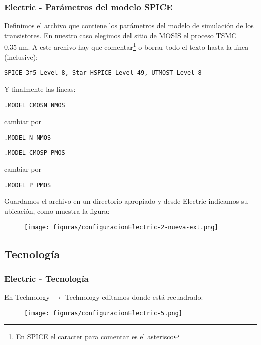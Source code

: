 \documentclass{beamer}
\begin{document}
\begin{frame}[fragile]
\frametitle{Electric - Parámetros del modelo SPICE}

Definimos el archivo que contiene los parámetros del modelo de simulación de los transistores.
En nuestro caso elegimos del sitio de \href{https://www.mosis.com/pages/design/flows/design-flow-scmos-kits}{MOSIS} el proceso \href{https://www.mosis.com/rep/vendors/tsmc-035/v01c_mm_non_epi-params.txt}{TSMC $0.35~\textrm{um}$}.
A este archivo hay que comentar\footnote{En SPICE el caracter para comentar es el asterisco}  o borrar todo el texto hasta la línea (inclusive):

\begin{scriptsize}
\verb.SPICE 3f5 Level 8, Star-HSPICE Level 49, UTMOST Level 8.
\end{scriptsize}

Y finalmente las líneas:

\begin{scriptsize}
\verb#.MODEL CMOSN NMOS#
\end{scriptsize} cambiar por \begin{scriptsize}\verb#.MODEL N NMOS# 

\verb#.MODEL CMOSP PMOS#\end{scriptsize} cambiar por \begin{scriptsize}\verb#.MODEL P PMOS# \end{scriptsize}

Guardamos el archivo en un directorio apropiado y desde Electric indicamos su ubicación,
como muestra la figura:
\begin{figure}
\texttt{[image: figuras/configuracionElectric-2-nueva-ext.png]}
\end{figure}

\end{frame}

\begin{frame}
\subsection{Tecnología}
\frametitle{Electric - Tecnología}

\noindent En Technology $\rightarrow$ Technology editamos donde está recuadrado:
\begin{figure}
\texttt{[image: figuras/configuracionElectric-5.png]}
\end{figure}
\end{frame}
\end{document}
